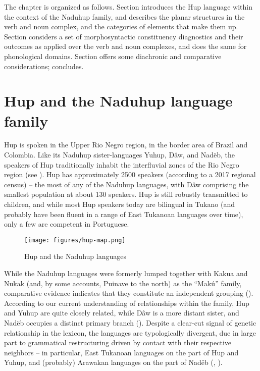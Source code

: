 \documentclass[output=paper]{langscibook}
\begin{document}
The chapter is organized as follows. Section  introduces the Hup language within the context of the Naduhup family, and  describes the planar structures in the verb and noun complex, and the categories of elements that make them up. Section  considers a set of morphosyntactic constituency diagnostics and their outcomes as applied over the verb and noun complexes, and  does the same for phonological domains. Section  offers some diachronic and comparative considerations;  concludes.


\section{Hup and the Naduhup language family} 
\label{sec:hup:key:2}

Hup is spoken in the Upper Rio Negro region, in the border area of Brazil and Colombia. Like its Naduhup sister-languages Yuhup, Dâw, and Nadëb, the speakers of Hup traditionally inhabit the interfluvial zones of the Rio Negro region (see ). Hup has approximately 2500 speakers (according to a 2017 regional census) – the most of any of the Naduhup languages, with Dâw comprising the smallest population at about 130 speakers. Hup is still robustly transmitted to children, and while most Hup speakers today are bilingual in Tukano (and probably have been fluent in a range of East Tukanoan languages over time), only a few are competent in Portuguese. 

\begin{figure}
    \texttt{[image: figures/hup-map.png]}
    \caption{Hup and the Naduhup languages}
    \label{fig:hup:key:1}
\end{figure}
  
While the Naduhup languages were formerly lumped together with Kakua and Nukak (and, by some accounts, Puinave to the north) as the ``Makú'' family, comparative evidence indicates that they constitute an independent grouping (\citealt{Epps2017}). According to our current understanding of relationships within the family, Hup and Yuhup are quite closely related, while Dâw is a more distant sister, and Nadëb occupies a distinct primary branch (). Despite a clear-cut signal of genetic relationship in the lexicon, the languages are typologically divergent, due in large part to grammatical restructuring driven by contact with their respective neighbors – in particular, East Tukanoan languages on the part of Hup and Yuhup, and (probably) Arawakan languages on the part of Nadëb (\citealt{Epps2007}, \citealt{Epps2017}). 
\end{document}
